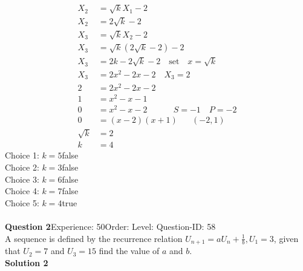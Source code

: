 \documentclass{article}
\begin{document}
\\[-35pt]\begin{align*}
X_2&=\sqrt{k}X_1-2\\[2pt]
X_2&=2\sqrt{k}-2\\[12pt]
X_3&=\sqrt{k}X_2-2\\[2pt]
X_3&=\sqrt{k}(2\sqrt{k}-2)-2\\[2pt]
X_3&=2k-2\sqrt{k}-2\quad \text{set}\quad x=\sqrt{k}\\[2pt]
X_3&=2x^2-2x-2 \quad X_3=2\\[2pt]
2&=2x^2-2x-2\\[2pt]
1&=x^2-x-1\\[2pt]
0&=x^2-x-2 \hspace{37pt} S=-1 \quad P=-2\\[2pt]
0&=(x-2)(x+1)\hspace{20pt} (-2,1)\\[2pt]
\sqrt{k}&=2\\[2pt]
k&=4
\end{align*}
Choice 1: \hspace{20pt}$k=5$\hspace{20pt}false\\
Choice 2: \hspace{20pt}$k=3$\hspace{20pt}false\\
Choice 3: \hspace{20pt}$k=6$\hspace{20pt}false\\
Choice 4: \hspace{20pt}$k=7$\hspace{20pt}false\\
Choice 5: \hspace{20pt}$k=4$\hspace{20pt}true\\
\\[4pt]
\noindent\textbf{Question 2}\hspace{20pt}Experience: 50\hspace{20pt}Order: \hspace{20pt}Level: \hspace{20pt}Question-ID: 58\\[2pt]
A sequence is defined by the recurrence relation $U_{n+1}=aU_n+\displaystyle\frac{1}{b}, U_1=3$, given that $U_2=7$ and $U_3=15$ find the value of $a$ and $b$.\\[4pt]
\noindent\textbf{Solution 2}\\[2pt]
\end{document}
